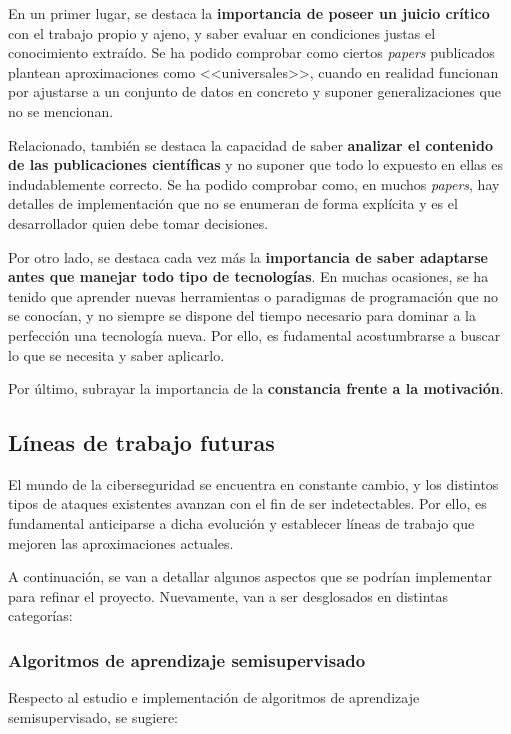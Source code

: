 En un primer lugar, se destaca la \textbf{importancia de poseer un juicio crítico} con el trabajo propio y ajeno, y saber evaluar en condiciones justas el conocimiento extraído. Se ha podido comprobar como ciertos \textit{papers} publicados plantean aproximaciones como <<universales>>, cuando en realidad funcionan por ajustarse a un conjunto de datos en concreto y suponer generalizaciones que no se mencionan.

Relacionado, también se destaca la capacidad de saber \textbf{analizar el contenido de las publicaciones científicas} y no suponer que todo lo expuesto en ellas es indudablemente correcto. Se ha podido comprobar como, en muchos \textit{papers}, hay detalles de implementación que no se enumeran de forma explícita y es el desarrollador quien debe tomar decisiones.

Por otro lado, se destaca cada vez más la \textbf{importancia de saber adaptarse antes que manejar todo tipo de tecnologías}. En muchas ocasiones, se ha tenido que aprender nuevas herramientas o paradigmas de programación que no se conocían, y no siempre se dispone del tiempo necesario para dominar a la perfección una tecnología nueva. Por ello, es fudamental acostumbrarse a buscar lo que se necesita y saber aplicarlo.

Por último, subrayar la importancia de la \textbf{constancia frente a la motivación}.


\subsection{Líneas de trabajo futuras}

El mundo de la ciberseguridad se encuentra en constante cambio, y los distintos tipos de ataques existentes avanzan con el fin de ser indetectables. Por ello, es fundamental anticiparse a dicha evolución y establecer líneas de trabajo que mejoren las aproximaciones actuales.

A continuación, se van a detallar algunos aspectos que se podrían implementar para refinar el proyecto. Nuevamente, van a ser desglosados en distintas categorías:

\subsubsection{Algoritmos de aprendizaje semisupervisado}

Respecto al estudio e implementación de algoritmos de aprendizaje semisupervisado, se sugiere:


